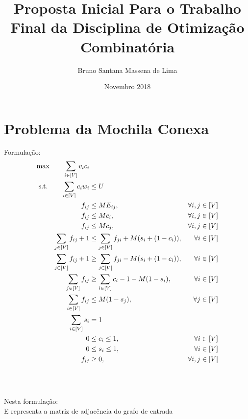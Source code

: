 \documentclass[14pt]{extarticle}
\title{Proposta Inicial Para o Trabalho Final da Disciplina de Otimização Combinatória}
\author{Bruno Santana Massena de Lima }
\date{Novembro 2018}
\begin{document}
\maketitle

\section{Problema da Mochila Conexa}
\noindent
Formulação:\\
\begin{gather*}
\begin{aligned}
\textup{max}\qquad \sum_{i\in[V]} v_i c_i\\
\textup{s.t.}\qquad \sum_{i \in [V]} c_i w_i     &\leq U\\
                    f_{ij}                      &\leq M E_{ij}, & \forall i,j \in [V]\\
                    f_{ij}                      &\leq M c_i,    & \forall i,j \in [V]\\
                    f_{ij}                      &\leq M c_j,    & \forall i,j \in [V]\\
                    \sum_{j \in [V]} f_{ij} + 1 &\leq \sum_{j \in [V]} f_{ji} + M(s_i + (1 - c_i)), & \forall i \in [V]\\
                    \sum_{j \in [V]} f_{ij} + 1 &\geq \sum_{j \in [V]} f_{ji} - M(s_i + (1 - c_i)), & \forall i \in [V]\\
                    \sum_{j \in [V]} f_{ij}     &\geq \sum_{i \in [V]} c_i - 1 - M(1 - s_i), & \forall i \in [V]\\
                    \sum_{i \in [V]} f_{ij}     &\leq M(1 - s_j), & \forall j \in [V]\\
                    \sum_{i \in [V]} s_i        &= 1\\
                    0 &\leq c_i \leq 1, & \forall i \in [V]\\
                    0 &\leq s_i \leq 1, & \forall i \in [V]\\
                    f_{ij}                      &\geq 0, & \forall i,j \in [V]\\
\end{aligned}
\end{gather*}
\\
\\
\\
\noindent
Nesta formulação:\\
\hspace*{2ex} E representa a matriz de adjacência do grafo de entrada\\
\end{document}
